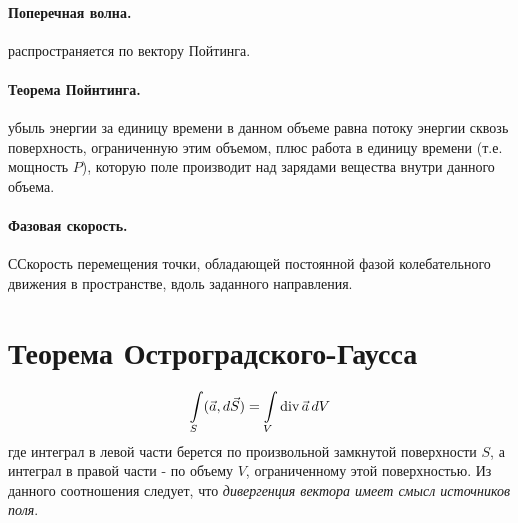 \documentclass[12pt]{extarticle}
\begin{document}
\paragraph{Поперечная волна.} распространяется
по вектору Пойтинга.

\paragraph{Теорема Пойнтинга.} убыль энергии за
единицу времени в данном объеме равна потоку энергии сквозь поверхность,
ограниченную этим объемом, плюс работа в единицу времени (т.е. мощность
$P$), которую поле производит над зарядами вещества внутри данного
объема.

\paragraph{Фазовая скорость.}ССкорость перемещения точки, обладающей постоянной фазой колебательного
движения в пространстве, вдоль заданного направления.

\section{Теорема Остроградского-Гаусса}
\begin{eqnarray*}
    \int\limits_{S}(\vec{a},d\vec{S})
    =\int\limits_{V}\textmd{div}\,\vec{a}\,dV
\end{eqnarray*}
где интеграл в левой части берется по произвольной замкнутой поверхности
$S$, а интеграл в правой части - по объему $V$, ограниченному этой
поверхностью. Из данного соотношения следует, что \textit{дивергенция
вектора имеет смысл источников поля}.



\end{document}
